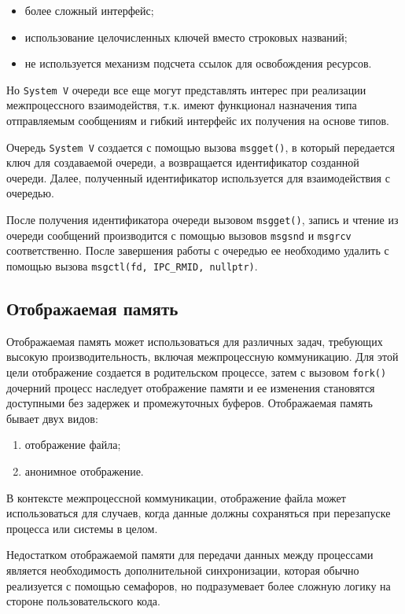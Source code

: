 \documentclass[14pt, russian]{scrartcl}
\begin{document}
\begin{itemize}
  \item более сложный интерфейс;
  \item использование целочисленных ключей вместо строковых названий;
  \item не используется механизм подсчета ссылок для освобождения ресурсов.
\end{itemize}

Но \verb|System V| очереди все еще могут представлять интерес при реализации
межпроцессного взаимодействя, т.к. имеют функционал назначения типа отправляемым
сообщениям и гибкий интерфейс их получения на основе типов.

Очередь \verb|System V| создается с помощью вызова \verb|msgget()|, в который
передается ключ для создаваемой очереди, а возвращается идентификатор созданной
очереди. Далее, полученный идентификатор используется для взаимодействия с
очередью.

После получения идентификатора очереди вызовом \verb|msgget()|, запись и чтение
из очереди сообщений производится с помощью вызовов \verb|msgsnd| и
\verb|msgrcv| соответственно. После завершения работы с очередью ее необходимо
удалить с помощью вызова \verb|msgctl(fd, IPC_RMID, nullptr)|.

\subsection{Отображаемая память}

Отображаемая память может использоваться для различных задач, требующих высокую
производительность, включая межпроцессную коммуникацию. Для этой цели
отображение создается в родительском процессе, затем с вызовом \verb|fork()|
дочерний процесс наследует отображение памяти и ее изменения становятся
доступными без задержек и промежуточных буферов. Отображаемая память бывает двух
видов:

\begin{enumerate}
  \item отображение файла;
  \item анонимное отображение.
\end{enumerate}

В контексте межпроцессной коммуникации, отображение файла может использоваться
для случаев, когда данные должны сохраняться при перезапуске процесса или
системы в целом.

Недостатком отображаемой памяти для передачи данных между процессами является
необходимость дополнительной синхронизации, которая обычно реализуется с помощью
семафоров, но подразумевает более сложную логику на стороне пользовательского
кода.
\end{document}
